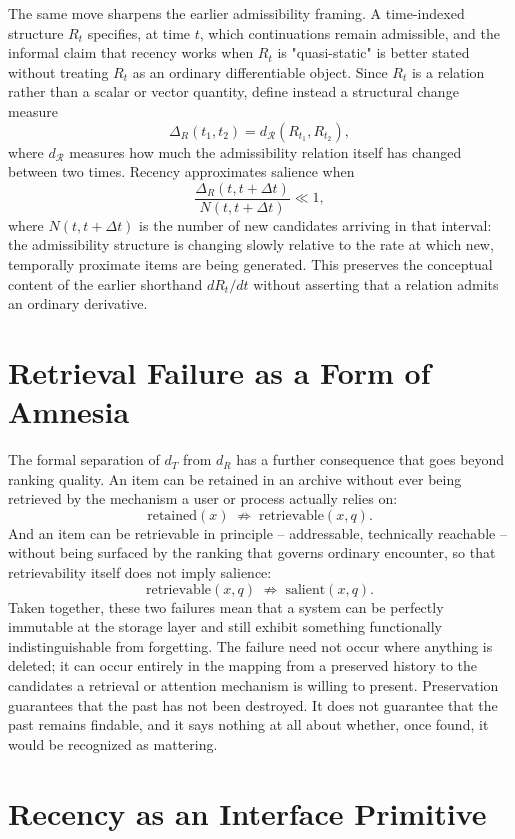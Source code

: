 \documentclass[11pt]{article}
\begin{document}
The same move sharpens the earlier admissibility framing. A time-indexed structure $R_t$ specifies, at time $t$, which continuations remain admissible, and the informal claim that recency works when $R_t$ is "quasi-static" is better stated without treating $R_t$ as an ordinary differentiable object. Since $R_t$ is a relation rather than a scalar or vector quantity, define instead a structural change measure
\[
\Delta_R(t_1,t_2) = d_{\mathcal R}(R_{t_1}, R_{t_2}),
\]
where $d_{\mathcal R}$ measures how much the admissibility relation itself has changed between two times. Recency approximates salience when
\[
\frac{\Delta_R(t,t+\Delta t)}{N(t,t+\Delta t)} \ll 1,
\]
where $N(t,t+\Delta t)$ is the number of new candidates arriving in that interval: the admissibility structure is changing slowly relative to the rate at which new, temporally proximate items are being generated. This preserves the conceptual content of the earlier shorthand $dR_t/dt$ without asserting that a relation admits an ordinary derivative.

\section{Retrieval Failure as a Form of Amnesia}

The formal separation of $d_T$ from $d_R$ has a further consequence that goes beyond ranking quality. An item can be retained in an archive without ever being retrieved by the mechanism a user or process actually relies on:
\[
\text{retained}(x) \;\not\Rightarrow\; \text{retrievable}(x,q).
\]
And an item can be retrievable in principle -- addressable, technically reachable -- without being surfaced by the ranking that governs ordinary encounter, so that retrievability itself does not imply salience:
\[
\text{retrievable}(x,q) \;\not\Rightarrow\; \text{salient}(x,q).
\]
Taken together, these two failures mean that a system can be perfectly immutable at the storage layer and still exhibit something functionally indistinguishable from forgetting. The failure need not occur where anything is deleted; it can occur entirely in the mapping from a preserved history to the candidates a retrieval or attention mechanism is willing to present. Preservation guarantees that the past has not been destroyed. It does not guarantee that the past remains findable, and it says nothing at all about whether, once found, it would be recognized as mattering.

\section{Recency as an Interface Primitive}
\end{document}
